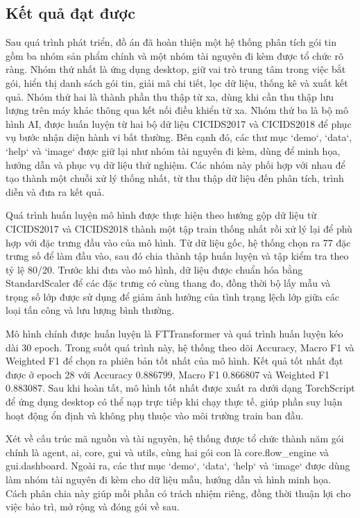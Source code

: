 \documentclass[../DoAn.tex]{subfiles}
\begin{document}
\subsection{Kết quả đạt được}
Sau quá trình phát triển, đồ án đã hoàn thiện một hệ thống phân tích gói tin gồm ba nhóm sản phẩm chính và một nhóm tài nguyên đi kèm được tổ chức rõ ràng. Nhóm thứ nhất là ứng dụng desktop, giữ vai trò trung tâm trong việc bắt gói, hiển thị danh sách gói tin, giải mã chi tiết, lọc dữ liệu, thống kê và xuất kết quả. Nhóm thứ hai là thành phần thu thập từ xa, dùng khi cần thu thập lưu lượng trên máy khác thông qua kết nối điều khiển từ xa. Nhóm thứ ba là bộ mô hình AI, được huấn luyện từ hai bộ dữ liệu CICIDS2017 và CICIDS2018 để phục vụ bước nhận diện hành vi bất thường. Bên cạnh đó, các thư mục `demo`, `data`, `help` và `image` được giữ lại như nhóm tài nguyên đi kèm, dùng để minh họa, hướng dẫn và phục vụ dữ liệu thử nghiệm. Các nhóm này phối hợp với nhau để tạo thành một chuỗi xử lý thống nhất, từ thu thập dữ liệu đến phân tích, trình diễn và đưa ra kết quả.

Quá trình huấn luyện mô hình được thực hiện theo hướng gộp dữ liệu từ CICIDS2017 và CICIDS2018 thành một tập train thống nhất rồi xử lý lại để phù hợp với đặc trưng đầu vào của mô hình. Từ dữ liệu gốc, hệ thống chọn ra 77 đặc trưng số để làm đầu vào, sau đó chia thành tập huấn luyện và tập kiểm tra theo tỷ lệ 80/20. Trước khi đưa vào mô hình, dữ liệu được chuẩn hóa bằng StandardScaler để các đặc trưng có cùng thang đo, đồng thời bộ lấy mẫu và trọng số lớp được sử dụng để giảm ảnh hưởng của tình trạng lệch lớp giữa các loại tấn công và lưu lượng bình thường.

Mô hình chính được huấn luyện là FTTransformer và quá trình huấn luyện kéo dài 30 epoch. Trong suốt quá trình này, hệ thống theo dõi Accuracy, Macro F1 và Weighted F1 để chọn ra phiên bản tốt nhất của mô hình. Kết quả tốt nhất đạt được ở epoch 28 với Accuracy 0.886799, Macro F1 0.866807 và Weighted F1 0.883087. Sau khi hoàn tất, mô hình tốt nhất được xuất ra dưới dạng TorchScript để ứng dụng desktop có thể nạp trực tiếp khi chạy thực tế, giúp phần suy luận hoạt động ổn định và không phụ thuộc vào môi trường train ban đầu.

Xét về cấu trúc mã nguồn và tài nguyên, hệ thống được tổ chức thành năm gói chính là agent, ai, core, gui và utils, cùng hai gói con là core.flow\_engine và gui.dashboard. Ngoài ra, các thư mục `demo`, `data`, `help` và `image` được dùng làm nhóm tài nguyên đi kèm cho dữ liệu mẫu, hướng dẫn và hình minh họa. Cách phân chia này giúp mỗi phần có trách nhiệm riêng, đồng thời thuận lợi cho việc bảo trì, mở rộng và đóng gói về sau.
\end{document}
